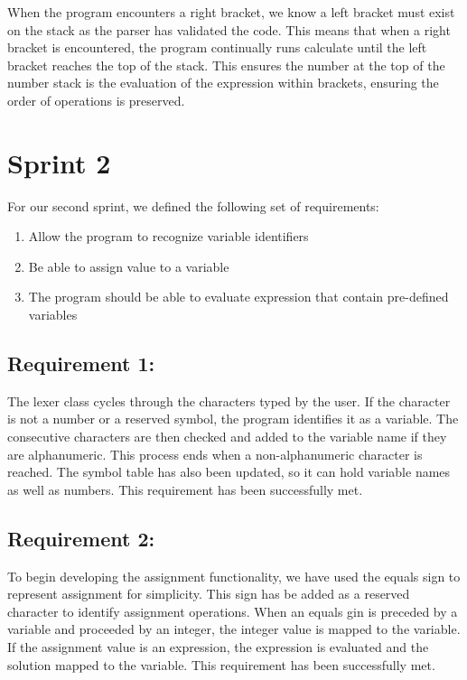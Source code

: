 \documentclass[a4paper, oneside, 11pt]{report}
\begin{document}
When the program encounters a right bracket, we know a left bracket must exist on the stack as the parser has validated the code. This means that when a right bracket is encountered, the program continually runs calculate until the left bracket reaches the top of the stack. This ensures the number at the top of the number stack is the evaluation of the expression within brackets, ensuring the order of operations is preserved. 

\section{Sprint 2}

For our second sprint, we defined the following set of requirements: 

\begin{enumerate}
\item Allow the program to recognize variable identifiers
\item Be able to assign value to a variable
\item The program should be able to evaluate expression that contain pre-defined variables
\end{enumerate}

\subsection{Requirement 1:}

The lexer class cycles through the characters typed by the user. If the character is not a number or a reserved symbol, the program identifies it as a variable. The consecutive characters are then checked and added to the variable name if they are alphanumeric. This process ends when a non-alphanumeric character is reached.
The symbol table has also been updated, so it can hold variable names as well as numbers.
This requirement has been successfully met.

\subsection{Requirement 2:}

To begin developing the assignment functionality, we have used the equals sign to represent assignment for simplicity. This sign has be added as a reserved character to identify assignment operations. When an equals gin is preceded by a variable and proceeded by an integer, the integer value is mapped to the variable. If the assignment value is an expression, the expression is evaluated and the solution mapped to the variable.
This requirement has been successfully met.
\end{document}
